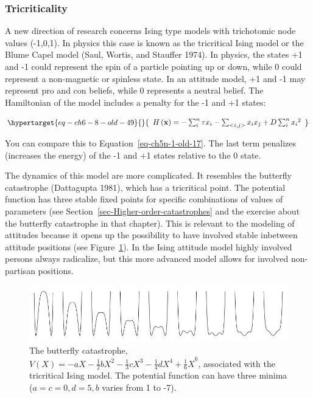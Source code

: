 \documentclass[
  a4paper,
  DIV=11,
  numbers=noendperiod,
  oneside]{scrreprt}
\begin{document}
\hypertarget{sec-Tricriticality}{%
\subsubsection{Tricriticality}\label{sec-Tricriticality}}

A new direction of research concerns Ising type models with trichotomic
node values (-1,0,1). In physics this case is known as the tricritical
Ising model or the Blume Capel model (Saul, Wortis, and Stauffer 1974).
In physics, the states +1 and -1 could represent the spin of a particle
pointing up or down, while 0 could represent a non-magnetic or spinless
state. In an attitude model, +1 and -1 may represent pro and con
beliefs, while 0 represents a neutral belief. The Hamiltonian of the
model includes a penalty for the -1 and +1 states:

\begin{equation}\protect\hypertarget{eq-ch6-8-old-49}{}{\begin{array}{r}
H\left( \mathbf{x} \right) = - \sum_{i}^{n}{\tau x_{i}} - \sum_{< i,j >}^{}{x_{i}x_{j}} + D\sum_{i}^{n}{x_{i}}^{2}
\end{array}}\label{eq-ch6-8-old-49}\end{equation}

You can compare this to Equation~\ref{eq-ch5n-1-old-17}. The last term
penalizes (increases the energy) of the -1 and +1 states relative to the
0 state.

The dynamics of this model are more complicated. It resembles the
butterfly catastrophe (Dattagupta 1981), which has a tricritical point.
The potential function has three stable fixed points for specific
combinations of values of parameters (see
Section~\ref{sec-Higher-order-catastrophes} and the exercise about the
butterfly catastrophe in that chapter). This is relevant to the modeling
of attitudes because it opens up the possibility to have involved stable
inbetween attitude positions (see Figure~\ref{fig-ch6-img15-old-84}). In
the Ising attitude model highly involved persons always radicalize, but
this more advanced model allows for involved non-partisan positions.

\begin{figure}

{\centering \includegraphics{media/ch6/image15.jpg}

}

\caption{\label{fig-ch6-img15-old-84}The butterfly catastrophe,
\(V(X) = {- aX - \frac{1}{2}bX^{2} - \frac{1}{3}cX^{3} - \frac{1}{4}dX^{4} + \frac{1}{6}X}^{6}\),
associated with the tricritical Ising model. The potential function can
have three minima (\(a = c = 0, d = 5, b\) varies from 1 to -7).}

\end{figure}
\end{document}
